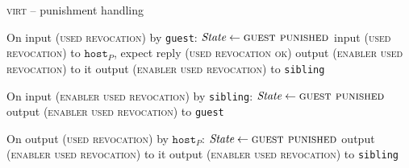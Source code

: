 \begin{center}
  \begin{processbox}{\textsc{virt} -- punishment handling}
    \begin{algorithmic}[1]
      \State On input (\textsc{used revocation}) by \texttt{guest}:
      \label{code:virtual-layer:punishment:when-punished-1}
      \Indent
        \State $\textit{State} \gets \textsc{guest punished}$
        \State input (\textsc{used revocation}) to $\texttt{host}_P$, expect
        reply (\textsc{used revocation ok})
          \State output (\textsc{enabler used revocation}) to it
        \Else \: 
          \State output (\textsc{enabler used revocation}) to \texttt{sibling}
        \EndIf
      \EndIndent
      \Statex

      \State On input (\textsc{enabler used revocation}) by \texttt{sibling}:
      \Indent
        \State $\textit{State} \gets \textsc{guest punished}$
        \State output (\textsc{enabler used revocation}) to \texttt{guest}
      \EndIndent
      \Statex

      \State On output (\textsc{used revocation}) by $\texttt{host}_P$:
      \label{code:virtual-layer:punishment:when-punished-2}
      \Indent
        \State $\itistate \gets \textsc{guest punished}$
          \State output (\textsc{enabler used revocation}) to it
        \Else \: 
          \State output (\textsc{enabler used revocation}) to \texttt{sibling}
        \EndIf
      \EndIndent
    \end{algorithmic}
  \end{processbox}
  \label{code:virtual-layer:punishment}
\end{center}
